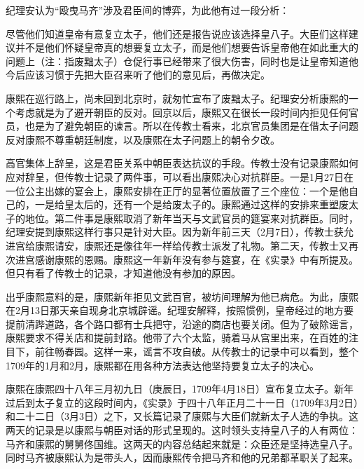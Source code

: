 纪理安认为“殴曳马齐”涉及君臣间的博弈，为此他有过一段分析：



\begin{bookquote}尽管他们知道皇帝有意复立太子，他们还是报告说应该选择皇八子。大臣们这样建议并不是他们怀疑皇帝真的想要复立太子，而是他们想要告诉皇帝他在如此重大的问题上（注：指废黜太子）仓促行事已经带来了很大伤害，同时也是让皇帝知道他今后应该习惯于先把大臣召来听了他们的意见后，再做决定。\end{bookquote}


康熙在巡行路上，尚未回到北京时，就匆忙宣布了废黜太子。纪理安分析康熙的一个考虑就是为了避开朝臣的反对。回京以后，康熙又在很长一段时间内拒见任何官员，也是为了避免朝臣的谏言。所以在传教士看来，北京官员集团是在借太子问题反对康熙不尊重朝廷制度，以及康熙在太子问题上的朝令夕改。



高官集体上辞呈，这是君臣关系中朝臣表达抗议的手段。传教士没有记录康熙如何应对辞呈，但传教士记录了两件事，可以看出康熙决心对抗群臣。一是1月27日在一位公主出嫁的宴会上，康熙安排在正厅的显著位置放置了三个座位：一个是他自己的，一是给皇太后的，还有一个是给废太子的。康熙通过这样的安排来重塑废太子的地位。第二件事是康熙取消了新年当天与文武官员的筵宴来对抗群臣。同时，纪理安提到康熙这样行事只是针对大臣。因为新年前三天（2月7日），传教士获允进宫给康熙请安，康熙还是像往年一样给传教士派发了礼物。第二天，传教士又再次进宫感谢康熙的恩赐。康熙这一年新年没有参与筵宴，在《实录》中有所提及。但只有看了传教士的记录，才知道他没有参加的原因。



出乎康熙意料的是，康熙新年拒见文武百官，被坊间理解为他已病危。为此，康熙在2月13日那天亲自现身北京城辟谣。纪理安解释，按照惯例，皇帝经过的地方要提前清跸道路，各个路口都有士兵把守，沿途的商店也要关闭。但为了破除谣言，康熙要求不得关店和提前封路。他带了六个太监，骑着马从宫里出来，在百姓的注目下，前往畅春园。这样一来，谣言不攻自破。从传教士的记录中可以看到，整个1709年的1月和2月，康熙都在用各种方法表达他坚持要复立太子的决心。



康熙在康熙四十八年三月初九日（庚辰日，1709年4月18日）宣布复立太子。新年过后到太子复立的这段时间内，《实录》于四十八年正月二十一日（1709年3月2日）和二十二日（3月3日）之下，又长篇记录了康熙与大臣们就新太子人选的争执。这两天的记录是以康熙与朝臣对话的形式呈现的。这时领头支持皇八子的人有两位：马齐和康熙的舅舅佟国维。这两天的内容总结起来就是：众臣还是坚持选皇八子。同时马齐被康熙认为是带头人，因而康熙传令把马齐和他的兄弟都革职关了起来。


